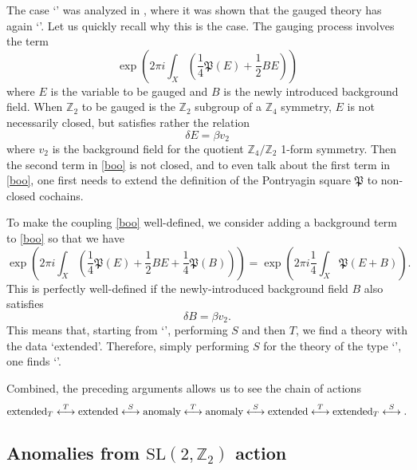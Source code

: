 \documentclass[12pt]{article}
\numberwithin{equation}{section}
\def\bZ{\mathbb{Z}}
\def\fP{\mathfrak{P}}
\def\SL{\mathrm{SL}}
\begin{document}
The case `\Textended' was analyzed in \cite{Hsin:2020nts},
where it was shown that the gauged theory has again `\Textended'.
Let us quickly recall why this is the case. 
The gauging process involves the term
 \begin{equation}
\exp\left(2\pi i\int_X ( \frac14 \fP(E) +\frac12 B E)\right)
\label{boo}
\end{equation}
where $E$ is the variable to be gauged and $B$ is the newly introduced background field.
When $\bZ_2$ to be gauged is the $\bZ_2$ subgroup of a $\bZ_4$ symmetry,
$E$ is not necessarily closed, but satisfies rather the relation \begin{equation}
\delta E = \beta v_2
\end{equation}
where $v_2$ is the background field for the quotient $\bZ_4/\bZ_2$ 1-form symmetry.
Then the second term in \eqref{boo} is not closed, 
and to even talk about the first term in \eqref{boo}, one first needs to extend the definition of the Pontryagin square $\fP$ to non-closed cochains.

To make  the coupling \eqref{boo}  well-defined, we consider adding a background term to \eqref{boo} so that we have \begin{equation}
\exp\left(2\pi i\int_X ( \frac14 \fP(E) +\frac12 B E + \frac14 \fP(B) )\right)
= 
\exp \left(2\pi i \frac14 \int_X \fP(E+B)\right) .
\end{equation}
This is perfectly well-defined if the newly-introduced background field $B$  also satisfies \begin{equation}
\delta B=\beta v_2.
\end{equation}
This means that, starting from `\Textended', performing $S$ and then $T$, we find a theory with the data `extended'.
Therefore, simply performing $S$ for the theory of the type `\Textended',  one  finds `\Textended'.

Combined, the preceding arguments allows us to  see the chain of actions \begin{equation}
\text{extended$_T$} \stackrel{T}{\longleftrightarrow} 
\text{extended} \stackrel{S}{\longleftrightarrow} 
\text{anomaly} \stackrel{T}{\longleftrightarrow} 
\text{anomaly} \stackrel{S}{\longleftrightarrow} 
\text{extended}\stackrel{T}{\longleftrightarrow} 
\text{extended$_T$}\stackrel{S}{\longleftrightarrow}.
\label{nontrivial-chain}
\end{equation}


\subsection{Anomalies from $\SL(2,\bZ_2)$ action} 
\end{document}
